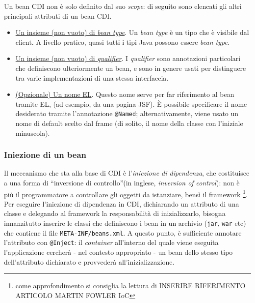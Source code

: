 Un bean CDI non è solo definito dal suo \textit{scope}: di seguito sono elencati gli altri principali attributi di un bean CDI.
\begin{itemize}
\item \underline{Un insieme (non vuoto) di \textit{bean type}}. Un \textit{bean type} è un tipo che è visibile dal client. A livello pratico, quasi tutti i tipi Java possono essere \textit{bean type}.
\item \underline{Un insieme (non vuoto) di \textit{qualifier}}. I \textit{qualifier} sono annotazioni particolari che definiscono ulteriormente un bean, e sono in genere usati per distinguere tra varie implementazioni di una stessa interfaccia.
\item \underline{(Opzionale) Un nome EL}. Questo nome serve per far riferimento al bean tramite EL, (ad esempio, da una pagina JSF). È possibile specificare il nome desiderato tramite l'annotazione \lstinline{@Named}; alternativamente, viene usato un nome di default scelto dal frame (di solito, il nome della classe con l'iniziale minuscola).
\end{itemize}

\subsubsection{Iniezione di un bean}
Il meccanismo che sta alla base di CDI è l'\textsl{iniezione di dipendenza}, che costituisce a una forma di \textquotedblleft inversione di controllo\textquotedblright (in inglese, \textit{inversion of control}): non è più il programmatore a controllare gli oggetti da istanziare, bensì il framework \footnote{come approfondimento si consiglia la lettura di INSERIRE RIFERIMENTO ARTICOLO MARTIN FOWLER IoC}.\\
Per eseguire l'iniezione di dipendenza in CDI, dichiarando un attributo di una classe e delegando al framework la responsabilità di inizializzarlo, bisogna innanzitutto inserire le classi che definiscono i bean in un archivio (\texttt{jar}, \texttt{war} etc) che contiene il file \texttt{META-INF/beans.xml}. A questo punto, è sufficiente annotare l'attributo con \lstinline{@Inject}: il \textit{container} all'interno del quale viene eseguita l'applicazione cercherà - nel contesto appropriato - un bean dello stesso tipo dell'attributo dichiarato e provvederà all'inizializzazione.\\


